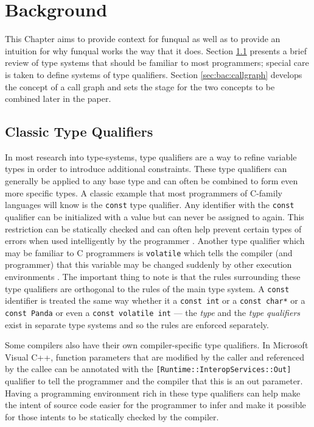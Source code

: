 \chapter{Background}\label{sec:background}

This Chapter aims to provide context for funqual as well as to provide an intuition for why funqual works the way that it does.  Section \ref{sec:bac:varqual} presents a brief review of type systems that should be familiar to most programmers; special care is taken to define systems of type qualifiers.  Section \ref{sec:bac:callgraph} develops the concept of a call graph and sets the stage for the two concepts to be combined later in the paper.  

\section{Classic Type Qualifiers}\label{sec:bac:varqual}

In most research into type-systems, type qualifiers are a way to refine variable types in order to introduce additional constraints.  These type qualifiers can generally be applied to any base type and can often be combined to form even more specific types.  A classic example that most programmers of C-family languages will know is the \lstinline{const} type qualifier.  Any identifier with the \lstinline{const} qualifier can be initialized with a value but can never be assigned to again.  This restriction can be statically checked and can often help prevent certain types of errors when used intelligently by the programmer \cite{theory-of-qual}.  Another type qualifier which may be familiar to C programmers is \lstinline{volatile} which tells the compiler (and programmer) that this variable may be changed suddenly by other execution environments \cite{theory-of-qual}.  The important thing to note is that the rules surrounding these type qualifiers are orthogonal to the rules of the main type system.  A \lstinline{const} identifier is treated the same way whether it a \lstinline{const int} or a \lstinline{const char*} or a \lstinline{const Panda} or even a \lstinline{const volatile int} --- the \textit{type} and the \textit{type qualifiers} exist in separate type systems and so the rules are enforced separately.  

Some compilers also have their own compiler-specific type qualifiers.  In Microsoft Visual C++, function parameters that are modified by the caller and referenced by the callee can be annotated with the \lstinline{[Runtime::InteropServices::Out]} qualifier to tell the programmer and the compiler that this is an out parameter.  Having a programming environment rich in these type qualifiers can help make the intent of source code easier for the programmer to infer and make it possible for those intents to be statically checked by the compiler.  

